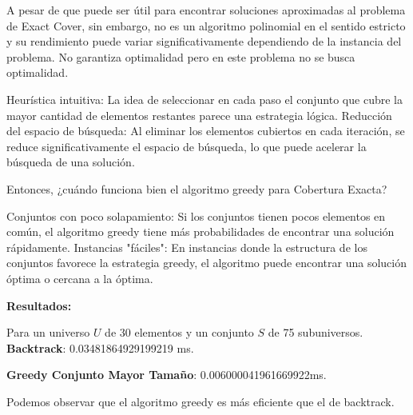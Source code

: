 \documentclass{article}
\begin{document}
A pesar de que puede ser útil para encontrar soluciones aproximadas al problema de Exact Cover, sin embargo, no es un algoritmo polinomial en el sentido estricto y su rendimiento puede variar significativamente dependiendo de la instancia del problema.
No garantiza optimalidad pero en este problema no se busca optimalidad.

Heurística intuitiva: La idea de seleccionar en cada paso el conjunto que cubre la mayor cantidad de elementos restantes parece una estrategia lógica.
Reducción del espacio de búsqueda: Al eliminar los elementos cubiertos en cada iteración, se reduce significativamente el espacio de búsqueda, lo que puede acelerar la búsqueda de una solución.

Entonces, ¿cuándo funciona bien el algoritmo greedy para Cobertura Exacta?

Conjuntos con poco solapamiento: Si los conjuntos tienen pocos elementos en común, el algoritmo greedy tiene más probabilidades de encontrar una solución rápidamente.
Instancias "fáciles": En instancias donde la estructura de los conjuntos favorece la estrategia greedy, el algoritmo puede encontrar una solución óptima o cercana a la óptima.

\textbf{Resultados:}

Para un universo \(U\) de 30 elementos y un conjunto \(S\) de 75 subuniversos. \\

\textbf{Backtrack}: 0.03481864929199219 ms.

\textbf{Greedy Conjunto Mayor Tamaño}: 0.006000041961669922ms.

Podemos observar que el algoritmo greedy es más eficiente que el de backtrack.
\end{document}
